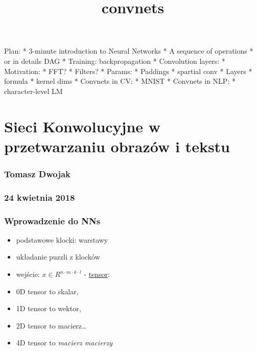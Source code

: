 \documentclass[11pt]{article}
\title{convnets}
\providecommand{\tightlist}{%
      \setlength{\itemsep}{0pt}\setlength{\parskip}{0pt}}
\begin{document}
    
    
    \maketitle
    
    

    
    Plan: * 3-minute introduction to Neural Networks * A sequence of
operations * or in details DAG * Training: backpropagation * Convolution
layers: * Motivation: * FFT? * Filters? * Params: * Paddings * spartial
conv * Layers * formula * kernel dims * Convnets in CV: * MNIST *
Convnets in NLP: * character-level LM

    \hypertarget{sieci-konwolucyjne-w-przetwarzaniu-obrazuxf3w-i-tekstu}{%
\section{Sieci Konwolucyjne w przetwarzaniu obrazów i
tekstu}\label{sieci-konwolucyjne-w-przetwarzaniu-obrazuxf3w-i-tekstu}}

\hypertarget{tomasz-dwojak}{%
\subsubsection{Tomasz Dwojak}\label{tomasz-dwojak}}

\hypertarget{kwietnia-2018}{%
\subsubsection{24 kwietnia 2018}\label{kwietnia-2018}}

    \hypertarget{wprowadzenie-do-nns}{%
\subsubsection{Wprowadzenie do NNs}\label{wprowadzenie-do-nns}}

    \begin{itemize}
\tightlist
\item
  podstawowe klocki: warstawy
\item
  układanie puzzli z klocków
\item
  wejście: \(x \in {R}^{n \cdot m \cdot k \cdot l}\) -
  \href{https://stats.stackexchange.com/questions/198061/why-the-sudden-fascination-with-tensors}{tensor}:
\item
  0D tensor to skalar,
\item
  1D tensor to wektor,
\item
  2D tensor to macierz\ldots{}
\item
  4D tensor to \emph{macierz macierzy}
\end{itemize}
\end{document}
